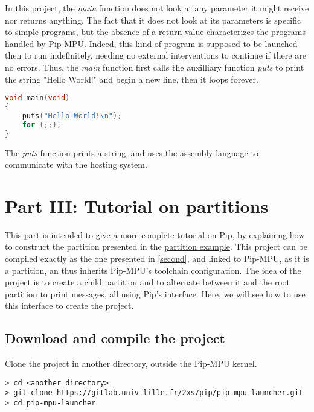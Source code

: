 \documentclass[10pt,a4paper,titlepage]{refart}
\begin{document}
In this project, the \textit{main} function does not look at any parameter it might receive nor returns anything. The fact that it does 
not look at its parameters is specific to simple programs, but the absence of a return value characterizes the programs handled by Pip-MPU. 
Indeed, this kind of program is supposed to be launched then to run indefinitely, needing no external interventions to continue if there 
are no errors. Thus, the  \textit{main} function first calls the auxilliary function \textit{puts} to print the string "Hello World!" and 
begin a new line, then it loops forever.

\begin{lstlisting}[language=C]
void main(void)
{
    puts("Hello World!\n");
    for (;;);
}
\end{lstlisting}

The \textit{puts} function prints a string, and uses the assembly language to communicate with the hosting system.

\section{Part III: Tutorial on partitions} \label{third}

This part is intended to give a more complete tutorial on Pip, by explaining how to construct the partition presented in the 
\href{(https://gitlab.univ-lille.fr/2xs/pip/pip-mpu-scheduler)}{partition example}. This project can be compiled exactly as 
the one presented in \cref{second}, and linked to Pip-MPU, as it is a partition, an thus inherits Pip-MPU's toolchain configuration.
The idea of the project is to create a child partition and to alternate between it and the root partition to print messages, all 
using Pip's interface. Here, we will see how to use this interface to create the project.

\subsection{Download and compile the project}


Clone the project in another directory, outside the Pip-MPU kernel.

\begin{lstlisting}[style=BashStyle]
> cd <another directory>
> git clone https://gitlab.univ-lille.fr/2xs/pip/pip-mpu-launcher.git
> cd pip-mpu-launcher
\end{lstlisting}
\end{document}
